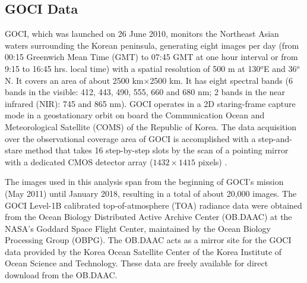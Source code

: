 \documentclass[remotesensing,article,submit,moreauthors,pdftex,10pt,a4paper]{Definitions/mdpi}
\begin{document}
\subsection{GOCI Data}
GOCI, which was launched on 26 June 2010, monitors the Northeast Asian waters surrounding the Korean peninsula, generating eight images per day (from 00:15 Greenwich Mean Time (GMT) to 07:45 GMT at one hour interval or from 9:15 to 16:45 hrs. local time) with a spatial resolution of 500 m at 130$^o$E and 36$^o$N. It covers an area of about 2500 km$\times$2500 km. It has eight spectral bands (6 bands in the visible: 412, 443, 490, 555, 660 and 680 nm; 2 bands in the near infrared (NIR): 745 and 865 nm). GOCI operates in a 2D staring-frame capture mode in a geostationary orbit on board the Communication Ocean and Meteorological Satellite (COMS) of the Republic of Korea. The data acquisition over the observational coverage area of GOCI is accomplished with a step-and-stare method that takes 16 step-by-step slots by the scan of a pointing mirror with a dedicated CMOS detector array ($1432\times1415$ pixels) \cite{Kang2010}. 

The images used in this analysis span from the beginning of GOCI's mission (May 2011) until January 2018, resulting in a total of about 20,000 images. The GOCI Level-1B calibrated top-of-atmosphere (TOA) radiance data were obtained from the Ocean Biology Distributed Active Archive Center (OB.DAAC) at the NASA's Goddard Space Flight Center, maintained by the Ocean Biology Processing Group (OBPG). The OB.DAAC acts as a mirror site for the GOCI data provided by the Korea Ocean Satellite Center of the Korea Institute of Ocean Science and Technology. These data are freely available for direct download from the OB.DAAC. 
\end{document}
